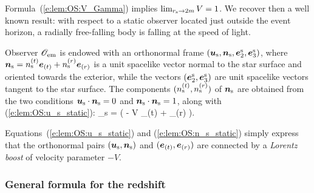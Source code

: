 \begin{remark}
Formula~(\ref{e:lem:OS:V_Gamma}) implies $\lim_{r_{\rm s}\to 2m} V = 1$. We recover
then a well known result: with respect to a static observer located just outside the event horizon,
a radially free-falling body is falling at the speed of light.
\end{remark}

Observer $\mathscr{O}_{\rm em}$ is endowed with an orthonormal frame
$(\bm{u}_{\rm s}, \bm{n}_{\rm s}, \bm{e}^{\rm s}_2, \bm{e}^{\rm s}_3)$,
where $\bm{n}_{\rm s} = n_{\rm s}^{(t)} \bm{e}_{(t)} + n_{\rm s}^{(r)} \bm{e}_{(r)}$
is a unit spacelike vector normal to the star surface and oriented towards the exterior,
while the vectors
$(\bm{e}^{\rm s}_2, \bm{e}^{\rm s}_3)$ are unit spacelike vectors
tangent to the star surface. The components $(n_{\rm s}^{(t)}, n_{\rm s}^{(r)})$
of $\bm{n}_{\rm s}$ are obtained from the two conditions
$\bm{u}_{\rm s}\cdot\bm{n}_{\rm s} = 0$ and $\bm{n}_{\rm s}\cdot\bm{n}_{\rm s} =1$,
along with (\ref{e:lem:OS:u_s_static}):
\be \label{e:lem:OS:n_s_static}
    _{\rm s} = \Gamma \left( - V _{(t)} +  _{(r)} \right).
\ee
\begin{remark}
Equations~(\ref{e:lem:OS:u_s_static}) and (\ref{e:lem:OS:n_s_static}) simply express
that the orthonormal pairs $(\bm{u}_{\rm s}, \bm{n}_{\rm s})$ and $(\bm{e}_{(t)},\bm{e}_{(r)})$
are connected by a \emph{Lorentz boost} of velocity parameter $-V$.
\end{remark}

\subsubsection{General formula for the redshift}

